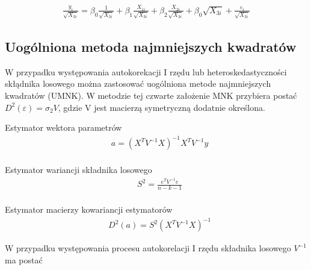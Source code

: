 \begin{equation}
    \begin{split}
        \frac{y_{i}}{\sqrt{X_{3i}}} = \beta_{0}\frac{1}{\sqrt{X_{3i}}} + \beta_{1}\frac{X_{1i}}{\sqrt{X_{3i}}} + \beta_{2}\frac{X_{2i}}{\sqrt{X_{3i}}} + \beta_{0}\sqrt{X_{3i}}+\frac{\varepsilon_{i}}{\sqrt{X_{3i}}}
    \end{split}
\end{equation}

\subsection{Uogólniona metoda najmniejszych kwadratów}\label{subsec:uogólniona-metoda-najmniejszych-kwadratów}

W przypadku występowania autokorekacji I rzędu lub heteroskedastyczności skłądnika losowego można zastosować uogólniona metode najmniejszych kwadratów (UMNK).
W metodzie tej czwarte założenie MNK przybiera postać \(D^{2}(\varepsilon) = \sigma_{2}V \), gdzie V jest macierzą symetryczną dodatnie określona.

\smallskip

Estymator wektora parametrów
\begin{equation}
    \begin{split}
        &a = (X^{T}V^{-1}X)^{-1} X^{T}V^{-1}y \\
    \end{split}
\end{equation}

Estymator wariancji składnika losowego
\begin{equation}
    \begin{split}
        &S^{2} = \frac{e^{T}V^{-1}e}{n-k-1} \\
    \end{split}
\end{equation}

Estymator macierzy kowariancji estymatorów
\begin{equation}
    \begin{split}
        &D^2(a) = S^2(X^{T}V^{-1}X)^{-1}
    \end{split}
\end{equation}

W przypadku występowania procesu autokorelacji I rzędu składnika losowego \(V^{-1}\) ma postać

